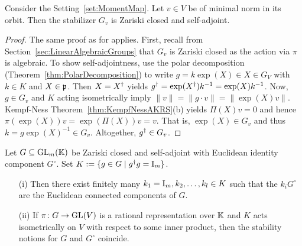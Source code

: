 \begin{lemma}\label{lem:StabilizerSelfAdjoint}
	Consider the Setting~\ref{set:MomentMap}. Let $v \in V$ be of minimal norm in its orbit. Then the stabilizer $G_v$ is Zariski closed and self-adjoint.
\end{lemma}

\begin{proof}
	The same proof as for \cite[Corollary~2.25]{Wallach} applies. First, recall from Section~\ref{sec:LinearAlgebraicGroups} that $G_v$ is Zariski closed as the action via $\pi$ is algebraic. To show self-adjointness, use the polar decomposition (Theorem~\ref{thm:PolarDecomposition}) to write $g = k \exp(X) \in X \in G_V$ with $k \in K$ and $X \in \mathfrak{p}$. Then $X = X^{\dagger}$ yields $g^{\dagger} = \exp(X^{\dagger}) k^{-1} = \exp(X) k^{-1}$. Now, $g \in G_v$ and $K$ acting isometrically imply $\|v\| = \|g \cdot v\| = \| \exp(X) v\|$. Kempf-Ness Theorem~\ref{thm:KempfNessAKRS}(b) yields $\Pi(X)v = 0$ and hence $\pi(\exp(X))v = \exp(\Pi(X)) v = v$. That is, $\exp(X) \in G_v$ and thus $k = g \exp(X)^{-1} \in G_v$. Altogether, $g^{\dagger} \in G_v$.
\end{proof}


\begin{prop}\label{prop:GvsIdentityComponent}
	Let $G \subseteq \operatorname{GL}_m(\mathbb K)$ be Zariski closed and self-adjoint with Euclidean identity component $G^\circ$. Set $K := \{ g \in G \mid g^{\dagger} g = \operatorname{I}_m\}$.
	\begin{itemize}
		\item[(i)] Then there exist finitely many $k_1 = \operatorname{I}_m, k_2, \ldots, k_l \in K$ such that the $k_i G^\circ$ are the Euclidean connected components of $G$.
		
		\item[(ii)] If $\pi \colon G \to \operatorname{GL}(V)$ is a rational representation over $\mathbb K$ and $K$ acts isometrically on $V$ with respect to some inner product, then the stability notions for $G$ and $G^\circ$ coincide.
	\end{itemize}
\end{prop}

